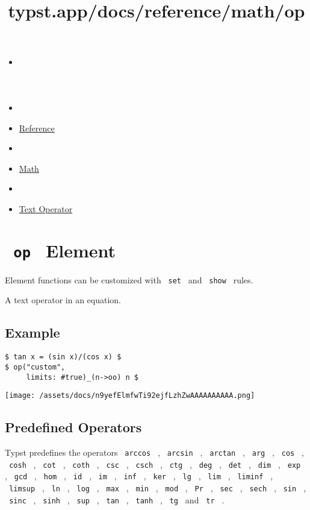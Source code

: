 \title{typst.app/docs/reference/math/op}

\begin{itemize}
\tightlist
\item
  \href{/docs}{}
\item
  
\item
  \href{/docs/reference/}{Reference}
\item
  
\item
  \href{/docs/reference/math/}{Math}
\item
  
\item
  \href{/docs/reference/math/op/}{Text Operator}
\end{itemize}

\section{\texorpdfstring{\texttt{\ op\ } {{ Element
}}}{ op   Element }}\label{summary}

\label{element-tooltip}
Element functions can be customized with \texttt{\ set\ } and
\texttt{\ show\ } rules.

A text operator in an equation.

\subsection{Example}\label{example}

\begin{verbatim}
$ tan x = (sin x)/(cos x) $
$ op("custom",
     limits: #true)_(n->oo) n $
\end{verbatim}

\texttt{[image: /assets/docs/n9yefElmfwTi92ejfLzhZwAAAAAAAAAA.png]}

\subsection{Predefined Operators}\label{predefined}

Typst predefines the operators \texttt{\ arccos\ } , \texttt{\ arcsin\ }
, \texttt{\ arctan\ } , \texttt{\ arg\ } , \texttt{\ cos\ } ,
\texttt{\ cosh\ } , \texttt{\ cot\ } , \texttt{\ coth\ } ,
\texttt{\ csc\ } , \texttt{\ csch\ } , \texttt{\ ctg\ } ,
\texttt{\ deg\ } , \texttt{\ det\ } , \texttt{\ dim\ } ,
\texttt{\ exp\ } , \texttt{\ gcd\ } , \texttt{\ hom\ } , \texttt{\ id\ }
, \texttt{\ im\ } , \texttt{\ inf\ } , \texttt{\ ker\ } ,
\texttt{\ lg\ } , \texttt{\ lim\ } , \texttt{\ liminf\ } ,
\texttt{\ limsup\ } , \texttt{\ ln\ } , \texttt{\ log\ } ,
\texttt{\ max\ } , \texttt{\ min\ } , \texttt{\ mod\ } , \texttt{\ Pr\ }
, \texttt{\ sec\ } , \texttt{\ sech\ } , \texttt{\ sin\ } ,
\texttt{\ sinc\ } , \texttt{\ sinh\ } , \texttt{\ sup\ } ,
\texttt{\ tan\ } , \texttt{\ tanh\ } , \texttt{\ tg\ } and
\texttt{\ tr\ } .


